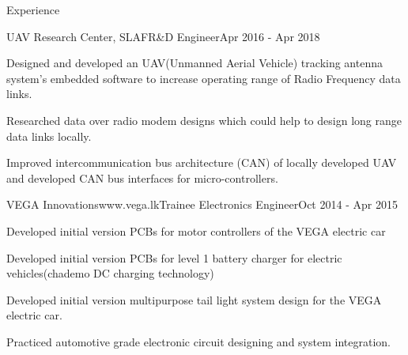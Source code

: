 \documentclass[
11pt, %
]{./assets/resume} %
\begin{document}
\begin{rSection}{Experience}
\begin{rSubsectionX}{UAV Research Center, SLAF}{}{R\&D Engineer}{Apr 2016 - Apr 2018}
		\item Designed and developed an UAV(Unmanned Aerial Vehicle)  tracking antenna system’s embedded software to increase operating range of Radio Frequency data links. 
		\item Researched data over radio modem designs which could help to design long range data links locally. 
		\item Improved intercommunication bus architecture (CAN) of locally developed UAV and developed CAN bus interfaces for micro-controllers.
	\end{rSubsectionX}
	\begin{rSubsectionX}{VEGA Innovations}{www.vega.lk}{Trainee Electronics Engineer}{Oct 2014 - Apr 2015}
		\item Developed initial version PCBs for motor controllers of the VEGA electric car
		\item Developed initial version PCBs for level 1 battery charger for electric vehicles(chademo DC charging technology)
		\item Developed initial version multipurpose tail light system design for the VEGA electric car.
		\item Practiced automotive grade electronic circuit designing and system integration.
	\end{rSubsectionX}
	
\end{rSection}


	
\end{document}
